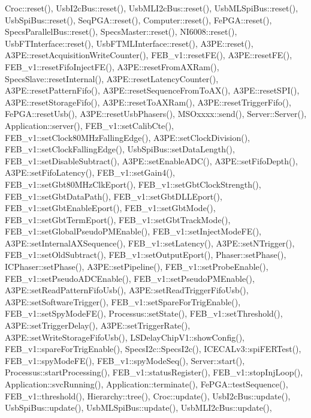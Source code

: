 Croc\+::reset(), Usb\+I2c\+Bus\+::reset(), Usb\+M\+L\+I2c\+Bus\+::reset(), Usb\+M\+L\+Spi\+Bus\+::reset(), Usb\+Spi\+Bus\+::reset(), Seq\+P\+G\+A\+::reset(), Computer\+::reset(), Fe\+P\+G\+A\+::reset(), Specs\+Parallel\+Bus\+::reset(), Specs\+Master\+::reset(), N\+I6008\+::reset(), Usb\+F\+T\+Interface\+::reset(), Usb\+F\+T\+M\+L\+Interface\+::reset(), A3\+P\+E\+::reset(), A3\+P\+E\+::reset\+Acquisition\+Write\+Counter(), F\+E\+B\+\_\+v1\+::reset\+F\+E(), A3\+P\+E\+::reset\+F\+E(), F\+E\+B\+\_\+v1\+::reset\+Fifo\+Inject\+F\+E(), A3\+P\+E\+::reset\+From\+A\+X\+Ram(), Specs\+Slave\+::reset\+Internal(), A3\+P\+E\+::reset\+Latency\+Counter(), A3\+P\+E\+::reset\+Pattern\+Fifo(), A3\+P\+E\+::reset\+Sequence\+From\+To\+A\+X(), A3\+P\+E\+::reset\+S\+P\+I(), A3\+P\+E\+::reset\+Storage\+Fifo(), A3\+P\+E\+::reset\+To\+A\+X\+Ram(), A3\+P\+E\+::reset\+Trigger\+Fifo(), Fe\+P\+G\+A\+::reset\+Usb(), A3\+P\+E\+::reset\+Usb\+Phasers(), M\+S\+Oxxxx\+::send(), Server\+::\+Server(), Application\+::server(), F\+E\+B\+\_\+v1\+::set\+Calib\+Cte(), F\+E\+B\+\_\+v1\+::set\+Clock80\+M\+Hz\+Falling\+Edge(), A3\+P\+E\+::set\+Clock\+Division(), F\+E\+B\+\_\+v1\+::set\+Clock\+Falling\+Edge(), Usb\+Spi\+Bus\+::set\+Data\+Length(), F\+E\+B\+\_\+v1\+::set\+Disable\+Subtract(), A3\+P\+E\+::set\+Enable\+A\+D\+C(), A3\+P\+E\+::set\+Fifo\+Depth(), A3\+P\+E\+::set\+Fifo\+Latency(), F\+E\+B\+\_\+v1\+::set\+Gain4(), F\+E\+B\+\_\+v1\+::set\+Gbt80\+M\+Hz\+Clk\+Eport(), F\+E\+B\+\_\+v1\+::set\+Gbt\+Clock\+Strength(), F\+E\+B\+\_\+v1\+::set\+Gbt\+Data\+Path(), F\+E\+B\+\_\+v1\+::set\+Gbt\+D\+L\+L\+Eport(), F\+E\+B\+\_\+v1\+::set\+Gbt\+Enable\+Eport(), F\+E\+B\+\_\+v1\+::set\+Gbt\+Mode(), F\+E\+B\+\_\+v1\+::set\+Gbt\+Term\+Eport(), F\+E\+B\+\_\+v1\+::set\+Gbt\+Track\+Mode(), F\+E\+B\+\_\+v1\+::set\+Global\+Pseudo\+P\+M\+Enable(), F\+E\+B\+\_\+v1\+::set\+Inject\+Mode\+F\+E(), A3\+P\+E\+::set\+Internal\+A\+X\+Sequence(), F\+E\+B\+\_\+v1\+::set\+Latency(), A3\+P\+E\+::set\+N\+Trigger(), F\+E\+B\+\_\+v1\+::set\+Old\+Subtract(), F\+E\+B\+\_\+v1\+::set\+Output\+Eport(), Phaser\+::set\+Phase(), I\+C\+Phaser\+::set\+Phase(), A3\+P\+E\+::set\+Pipeline(), F\+E\+B\+\_\+v1\+::set\+Probe\+Enable(), F\+E\+B\+\_\+v1\+::set\+Pseudo\+A\+D\+C\+Enable(), F\+E\+B\+\_\+v1\+::set\+Pseudo\+P\+M\+Enable(), A3\+P\+E\+::set\+Read\+Pattern\+Fifo\+Usb(), A3\+P\+E\+::set\+Read\+Trigger\+Fifo\+Usb(), A3\+P\+E\+::set\+Software\+Trigger(), F\+E\+B\+\_\+v1\+::set\+Spare\+For\+Trig\+Enable(), F\+E\+B\+\_\+v1\+::set\+Spy\+Mode\+F\+E(), Processus\+::set\+State(), F\+E\+B\+\_\+v1\+::set\+Threshold(), A3\+P\+E\+::set\+Trigger\+Delay(), A3\+P\+E\+::set\+Trigger\+Rate(), A3\+P\+E\+::set\+Write\+Storage\+Fifo\+Usb(), L\+S\+Delay\+Chip\+V1\+::show\+Config(), F\+E\+B\+\_\+v1\+::spare\+For\+Trig\+Enable(), Specs\+I2c\+::\+Specs\+I2c(), I\+C\+E\+C\+A\+Lv3\+::spi\+F\+E\+R\+Test(), F\+E\+B\+\_\+v1\+::spy\+Mode\+F\+E(), F\+E\+B\+\_\+v1\+::spy\+Mode\+Seq(), Server\+::start(), Processus\+::start\+Processing(), F\+E\+B\+\_\+v1\+::status\+Register(), F\+E\+B\+\_\+v1\+::stop\+Inj\+Loop(), Application\+::svc\+Running(), Application\+::terminate(), Fe\+P\+G\+A\+::test\+Sequence(), F\+E\+B\+\_\+v1\+::threshold(), Hierarchy\+::tree(), Croc\+::update(), Usb\+I2c\+Bus\+::update(), Usb\+Spi\+Bus\+::update(), Usb\+M\+L\+Spi\+Bus\+::update(), Usb\+M\+L\+I2c\+Bus\+::update(), 